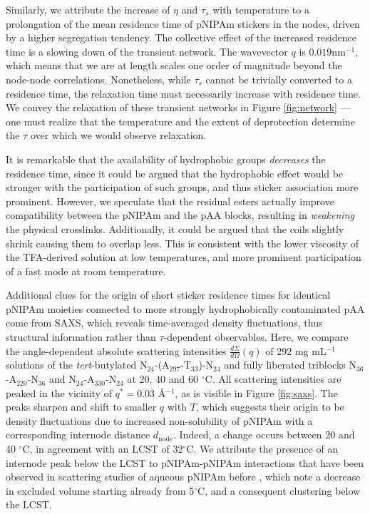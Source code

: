 \documentclass{article}
\begin{document}
Similarly, we attribute the increase of $\eta$ and $\tau_s$ with temperature
to a prolongation of the mean residence time of pNIPAm stickers in the nodes, 
driven by a higher segregation tendency. The collective effect of the increased 
residence time is a slowing down of the transient network. The wavevector $q$ is 
$0.019\mathrm{nm}^{-1}$, which means that we 
are at length scales one order of magnitude beyond the node-node correlations.
Nonetheless, while $\tau_s$ cannot be trivially converted to a residence time,
the relaxation time must necessarily increase with residence time.\cite{Bohdan2016} 
We convey the relaxation of these transient networks in Figure 
\ref{fig:network} --- one must realize that the temperature and the extent of 
deprotection determine the $\tau$ over which we would observe relaxation.


It is remarkable that the availability of hydrophobic groups \emph{decreases} the residence time, 
since it could be argued that the hydrophobic effect would be stronger with the participation of such groups, 
and thus sticker association more prominent. However, we speculate that the residual esters 
actually improve compatibility between the pNIPAm and the pAA blocks, 
resulting in \emph{weakening} the physical crosslinks. Additionally, it could 
be argued that the coils slightly shrink causing them to overlap less. This is 
consistent with the lower viscosity of the TFA-derived solution at low temperatures,
and more prominent participation of a fast mode at room temperature.


Additional clues for the origin of short sticker residence times for identical pNIPAm moieties
connected to more strongly hydrophobically contaminated pAA come from SAXS, which 
reveals time-averaged 
density fluctuations, thus structural information rather than $\tau$-dependent observables.
Here, we compare the angle-dependent absolute scattering intensities $\frac{d\Sigma}{d\Omega}(q)$ 
of 292 mg mL$^{-1}$ solutions of 
the \emph{tert}-butylated N$_\mathrm{24}$-(A$_\mathrm{297}$-T$_\mathrm{33}$)-N$_\mathrm{24}$ 
and fully liberated triblocks 
N$_\mathrm{36}$-A$_\mathrm{220}$-N$_\mathrm{36}$ and 
N$_\mathrm{24}$-A$_\mathrm{330}$-N$_\mathrm{24}$ at
20, 40 and 60 $^\circ\mathrm{C}$. All scattering intensities are peaked in the 
vicinity of $q^*=$0.03 \AA$^{-1}$, as is
visible in Figure \ref{fig:saxs}. The peaks sharpen and shift to smaller $q$ with $T$,
which suggests their origin to be density fluctuations due to increased non-solubility 
of pNIPAm with a corresponding internode distance $d_\mathrm{node}$.
Indeed, a change occurs between 20 and 40 $^\circ\mathrm{C}$, in agreement with an 
LCST of 32$^\circ\mathrm{C}$. We attribute the presence of an internode peak below the 
LCST to pNIPAm-pNIPAm interactions
that have been observed in scattering studies of aqueous pNIPAm before \cite{Lang2017}, 
which note a decrease in excluded 
volume starting already from 5$^\circ\mathrm{C}$, and a consequent clustering below the 
LCST.\cite{Kawaguchi2009} 
\end{document}
